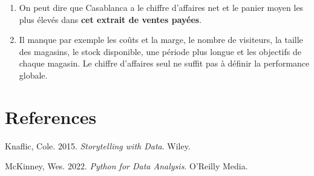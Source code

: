 \documentclass[
  french,
  letterpaper,
  open=any]{scrbook}
\newlength{\cslhangindent}
\newenvironment{CSLReferences}[2] %
 {\begin{list}{}{%
  \setlength{\itemindent}{0pt}
  \setlength{\leftmargin}{0pt}
  \setlength{\parsep}{0pt}
  \ifodd #1
   \setlength{\leftmargin}{\cslhangindent}
   \setlength{\itemindent}{-1\cslhangindent}
  \fi
  \setlength{\itemsep}{#2\baselineskip}}}
 {\end{list}}
\providecommand{\tightlist}{%
  \setlength{\itemsep}{0pt}\setlength{\parskip}{0pt}}
\theoremstyle{definition}
\theoremstyle{definition}
\theoremstyle{remark}
\begin{document}
\begin{tcolorbox}[enhanced jigsaw, arc=.35mm, bottomrule=.15mm, bottomtitle=1mm, breakable, colback=white, colbacktitle=quarto-callout-tip-color!10!white, colframe=quarto-callout-tip-color-frame, coltitle=black, left=2mm, leftrule=.75mm, opacityback=0, opacitybacktitle=0.6, rightrule=.15mm, title=\textcolor{quarto-callout-tip-color}{\faLightbulb}\hspace{0.5em}{Solution de l'exercice Exercice~\ref{exr-cas-8}}, titlerule=0mm, toprule=.15mm, toptitle=1mm]

\begin{enumerate}
\def\labelenumi{\alph{enumi}.}
\tightlist
\item
  On peut dire que Casablanca a le chiffre d'affaires net et le panier
  moyen les plus élevés dans \textbf{cet extrait de ventes payées}.
\item
  Il manque par exemple les coûts et la marge, le nombre de visiteurs,
  la taille des magasins, le stock disponible, une période plus longue
  et les objectifs de chaque magasin. Le chiffre d'affaires seul ne
  suffit pas à définir la performance globale.
\end{enumerate}

\end{tcolorbox}


\chapter*{References}\label{references}


\protect{}\label{refs}
\begin{CSLReferences}{1}{1}
Knaflic, Cole. 2015. \emph{Storytelling with Data}. Wiley.

McKinney, Wes. 2022. \emph{Python for Data Analysis}. O'Reilly Media.

\end{CSLReferences}


\backmatter
\end{document}
